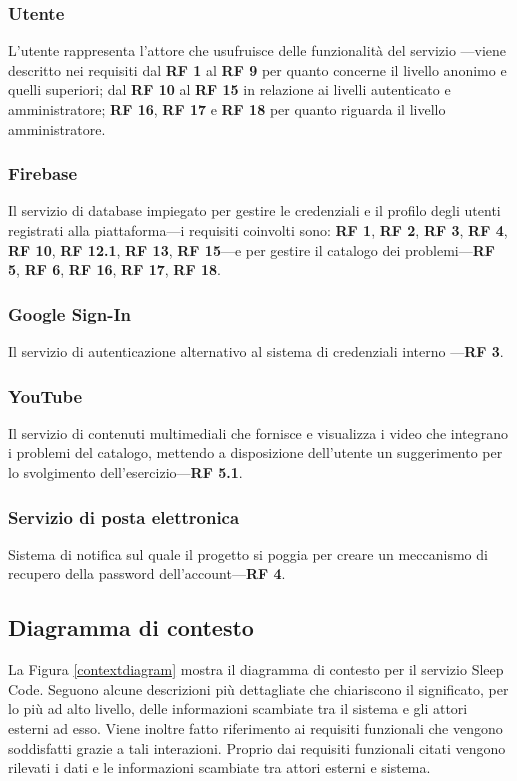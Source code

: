 \documentclass[11pt, a4paper]{article}
\theoremstyle{definition} %
\begin{document}
\subsubsection{Utente}
L'utente rappresenta l'attore che usufruisce delle funzionalità del servizio
—viene descritto nei requisiti dal \textbf{RF 1} al \textbf{RF 9} per quanto
concerne il livello anonimo e quelli superiori; dal \textbf{RF 10} al
\textbf{RF 15} in relazione ai livelli autenticato e amministratore; \textbf{RF 16},
\textbf{RF 17} e \textbf{RF 18} per quanto riguarda il livello amministratore.

\subsubsection{Firebase}
Il servizio di database impiegato per gestire le credenziali e il profilo
degli utenti registrati alla piattaforma—i requisiti coinvolti sono: \textbf{RF 1},
\textbf{RF 2}, \textbf{RF 3}, \textbf{RF 4}, \textbf{RF 10}, \textbf{RF 12.1},
\textbf{RF 13}, \textbf{RF 15}—e per gestire il catalogo dei problemi—\textbf{RF 5}, \textbf{RF 6},
\textbf{RF 16}, \textbf{RF 17}, \textbf{RF 18}.

\subsubsection{Google Sign-In}
Il servizio di autenticazione alternativo al sistema di credenziali interno
—\textbf{RF 3}.

\subsubsection{YouTube}
Il servizio di contenuti multimediali che fornisce e visualizza i video
che integrano i problemi del catalogo, mettendo a disposizione dell'utente
un suggerimento per lo svolgimento dell'esercizio—\textbf{RF 5.1}.

\subsubsection{Servizio di posta elettronica}
Sistema di notifica sul quale il progetto si poggia per creare un
meccanismo di recupero della password dell'account—\textbf{RF 4}.

\newpage
\subsection{Diagramma di contesto} %
La Figura \ref{contextdiagram} mostra il diagramma di contesto per il
servizio Sleep Code. Seguono alcune descrizioni più dettagliate
che chiariscono il significato, per lo più ad alto livello, delle
informazioni scambiate tra il sistema e gli attori esterni ad esso.
Viene inoltre fatto riferimento ai requisiti funzionali che vengono
soddisfatti grazie a tali interazioni. Proprio dai requisiti funzionali
citati vengono rilevati i dati e le informazioni scambiate tra attori
esterni e sistema.
\end{document}
